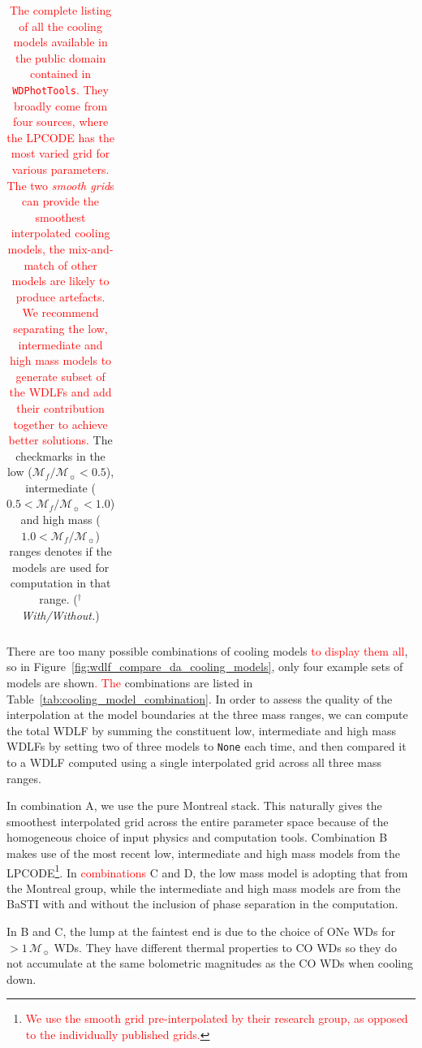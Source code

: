 \documentclass[fleqn,usenatbib]{rasti}
\newcommand{\msun}{\mathcal{M}_{\sun}}
\begin{document}
\begin{table}
\begin{tabular}{cccccccc}
    \end{tabular}
    \caption{\textcolor{red}{The complete listing of all the cooling models
    available in the public domain contained in \texttt{WDPhotTools}. They
    broadly come from four sources, where the LPCODE has the most varied
    grid for various parameters. The two \textit{smooth grid}s can provide
    the smoothest interpolated cooling models, the mix-and-match of other
    models are likely to produce artefacts. We recommend separating the
    low, intermediate and high mass models to generate subset of the WDLFs
    and add their contribution together to achieve better solutions.} The
    checkmarks in the low ($\mathcal{M}_f/\msun < 0.5$), intermediate
    ($0.5 < \mathcal{M}_f/\msun < 1.0$) and high mass ($1.0 < \mathcal{M}_f/\msun$)
    ranges denotes if the models are used for computation in that range.
    ($^{\dagger}$\textit{With/Without.})}
    \label{tab:cooling_models}
\end{table}

There are too many possible combinations of cooling models
\textcolor{red}{to display them all}, so in
Figure~\ref{fig:wdlf_compare_da_cooling_models}, only four example
sets of models are shown\textcolor{red}{. The} combinations are listed in
Table~\ref{tab:cooling_model_combination}. In order to assess the quality of
the interpolation at the model boundaries at the three mass ranges, we can
compute the total WDLF by summing the constituent low, intermediate and high
mass WDLFs by setting two of three models to \texttt{None} each time, and then
compared it to a WDLF computed using a single interpolated grid across
all three mass ranges.

In combination A, we use the pure Montreal stack. This naturally gives the
smoothest interpolated grid across the entire parameter space because of the
homogeneous choice of input physics and computation tools. Combination B makes
use of the most recent low, intermediate and high mass models from the
LPCODE\footnote{\textcolor{red}{We use the smooth grid pre-interpolated by
their research group, as opposed to the individually published grids.}}.
In \textcolor{red}{combinations} C and D, the low mass model is adopting that from the Montreal
group, while the intermediate and high mass models are from the BaSTI with and
without the inclusion of phase separation in the computation.

In B and C, the lump at the faintest end is due to the choice of ONe WDs for
$>1\,\msun$ WDs. They have different thermal properties to CO WDs so
they do not accumulate at the same bolometric magnitudes as the CO WDs when
cooling down.
\end{document}
